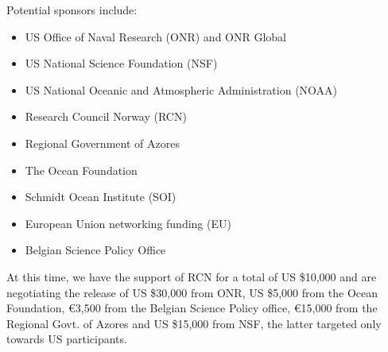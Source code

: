 Potential sponsors include:

\begin{itemize}[noitemsep,topsep=0pt,parsep=0pt,partopsep=0pt]

  \item US Office of Naval Research (ONR) and ONR Global
  \item US National Science Foundation (NSF)
  \item US National Oceanic and Atmospheric Administration (NOAA)
  \item Research Council Norway (RCN)
  \item Regional Government of Azores
  \item The Ocean Foundation
  \item Schmidt Ocean Institute (SOI)
  \item European Union networking funding (EU)
  \item Belgian Science Policy Office

\end{itemize}

\noindent
At this time, we have the support of RCN for a total of US \$10,000
and are negotiating the release of US \$30,000 from ONR, US \$5,000
from the Ocean Foundation, \euro 3,500 from the Belgian Science
Policy office, \euro 15,000 from the Regional Govt. of Azores and US
\$15,000 from NSF, the latter targeted only towards US participants.


